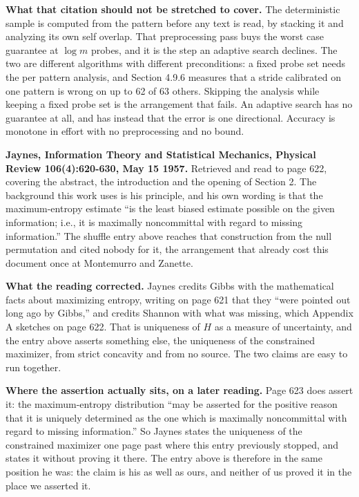 \textbf{What that citation should not be stretched to cover.} The deterministic sample is computed from the pattern before any text is read, by stacking it and analyzing its own self overlap. That preprocessing pass buys the worst case guarantee at \(\log m\) probes, and it is the step an adaptive search declines. The two are different algorithms with different preconditions: a fixed probe set needs the per pattern analysis, and Section 4.9.6 measures that a stride calibrated on one pattern is wrong on up to 62 of 63 others. Skipping the analysis while keeping a fixed probe set is the arrangement that fails. An adaptive search has no guarantee at all, and has instead that the error is one directional. Accuracy is monotone in effort with no preprocessing and no bound.

\textbf{Jaynes, Information Theory and Statistical Mechanics, Physical Review 106(4):620-630, May 15 1957.} Retrieved and read to page 622, covering the abstract, the introduction and the opening of Section 2. The background this work uses is his principle, and his own wording is that the maximum-entropy estimate ``is the least biased estimate possible on the given information; i.e., it is maximally noncommittal with regard to missing information.'' The shuffle entry above reaches that construction from the null permutation and cited nobody for it, the arrangement that already cost this document once at Montemurro and Zanette.

\textbf{What the reading corrected.} Jaynes credits Gibbs with the mathematical facts about maximizing entropy, writing on page 621 that they ``were pointed out long ago by Gibbs,'' and credits Shannon with what was missing, which Appendix A sketches on page 622. That is uniqueness of \(H\) as a measure of uncertainty, and the entry above asserts something else, the uniqueness of the constrained maximizer, from strict concavity and from no source. The two claims are easy to run together.

\textbf{Where the assertion actually sits, on a later reading.} Page 623 does assert it: the maximum-entropy distribution ``may be asserted for the positive reason that it is uniquely determined as the one which is maximally noncommittal with regard to missing information.'' So Jaynes states the uniqueness of the constrained maximizer one page past where this entry previously stopped, and states it without proving it there. The entry above is therefore in the same position he was: the claim is his as well as ours, and neither of us proved it in the place we asserted it.

